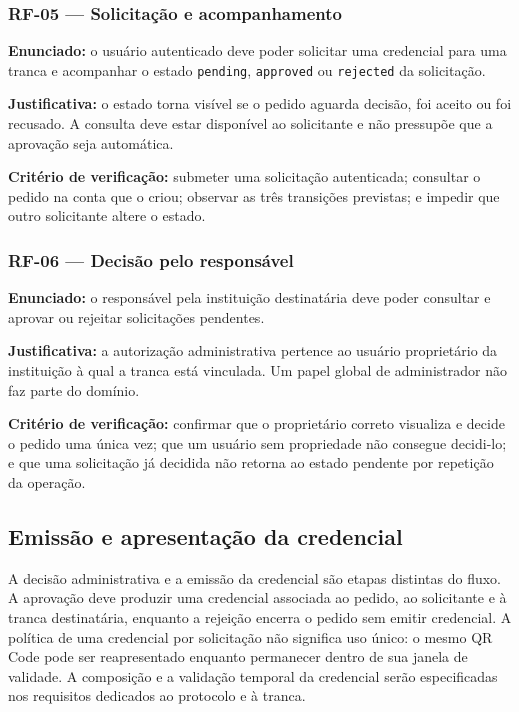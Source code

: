 \subsubsection*{RF-05 --- Solicitação e acompanhamento}

\textbf{Enunciado:} o usuário autenticado deve poder solicitar uma credencial para uma tranca e acompanhar o estado \texttt{pending}, \texttt{approved} ou \texttt{rejected} da solicitação.

\textbf{Justificativa:} o estado torna visível se o pedido aguarda decisão, foi aceito ou foi recusado. A consulta deve estar disponível ao solicitante e não pressupõe que a aprovação seja automática.

\textbf{Critério de verificação:} submeter uma solicitação autenticada; consultar o pedido na conta que o criou; observar as três transições previstas; e impedir que outro solicitante altere o estado.

\subsubsection*{RF-06 --- Decisão pelo responsável}

\textbf{Enunciado:} o responsável pela instituição destinatária deve poder consultar e aprovar ou rejeitar solicitações pendentes.

\textbf{Justificativa:} a autorização administrativa pertence ao usuário proprietário da instituição à qual a tranca está vinculada. Um papel global de administrador não faz parte do domínio.

\textbf{Critério de verificação:} confirmar que o proprietário correto visualiza e decide o pedido uma única vez; que um usuário sem propriedade não consegue decidi-lo; e que uma solicitação já decidida não retorna ao estado pendente por repetição da operação.

\subsection{Emissão e apresentação da credencial}

A decisão administrativa e a emissão da credencial são etapas distintas do fluxo. A aprovação deve produzir uma credencial associada ao pedido, ao solicitante e à tranca destinatária, enquanto a rejeição encerra o pedido sem emitir credencial. A política de uma credencial por solicitação não significa uso único: o mesmo QR Code pode ser reapresentado enquanto permanecer dentro de sua janela de validade. A composição e a validação temporal da credencial serão especificadas nos requisitos dedicados ao protocolo e à tranca.

